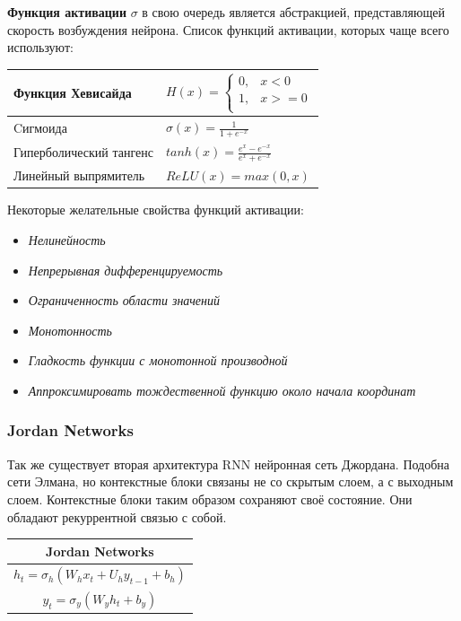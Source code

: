 	\textbf{Функция активации} $\sigma$ в свою очередь является абстракцией, представляющей скорость возбуждения нейрона. Список функций активации, которых чаще всего используют:
	
	\begin{table}[h]
		\centering
		\begin{tabular}{|l|l|} 
			\hline
			Функция Хевисайда       &   
			$ H(x) = 
			\begin{cases}
				0, & x < 0 \\
				1, & x >= 0 \\
			\end{cases}$ \\ 
			\hline
			Cигмоида                &  $\sigma(x) = \frac{1}{1 + e^{-x}}$ \\ 
			\hline
			Гиперболический тангенс &  $tanh(x) = \frac{e^x - e^{-x}}{e^x + e^{-x}}$ \\ 
			\hline
			Линейный выпрямитель    &  $ReLU(x) = max(0, x)$ \\
			\hline
		\end{tabular}
	\end{table}
	
	Некоторые желательные свойства функций активации:
	
	\begin{itemize}
		\item \textit{Нелинейность}
		\item \textit{Непрерывная дифференцируемость}
		\item \textit{Ограниченность области значений}
		\item \textit{Монотонность}
		\item \textit{Гладкость функции с монотонной производной}
		\item \textit{Аппроксимировать тождественной функцию около начала координат}
	\end{itemize}
	
	\subsubsection{Jordan Networks}
    
    Так же существует вторая архитектура RNN нейронная сеть Джордана. Подобна сети Элмана, но контекстные блоки связаны не со скрытым слоем, а с выходным слоем. Контекстные блоки таким образом сохраняют своё состояние. Они обладают рекуррентной связью с собой.
    
	\begin{table}[h]
			\centering
			\begin{tabular}{|c|} 
				\hline
				\textbf{Jordan Networks}  \\ 
				\hline
				$	h_{t} = \sigma_{h}(W_h x_t + U_h y_{t - 1} + b_h) $  \\
				$	y_{t} = \sigma_{y}(W_y h_t + b_y) $ \\
				\hline
			\end{tabular}
	\end{table}
	
